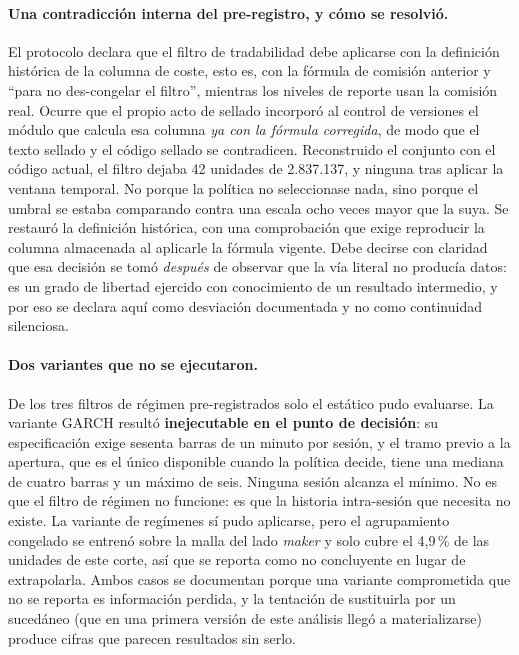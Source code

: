 \paragraph{Una contradicción interna del pre-registro, y cómo se resolvió.} El protocolo
declara que el filtro de tradabilidad debe aplicarse con la definición histórica de la
columna de coste, esto es, con la fórmula de comisión anterior y ``para no des-congelar el
filtro'', mientras los niveles de reporte usan la comisión real. Ocurre que el propio acto de sellado
incorporó al control de versiones el módulo que calcula esa columna \emph{ya con la
fórmula corregida}, de modo que el texto sellado y el código sellado se contradicen.
Reconstruido el conjunto con el código actual, el filtro dejaba 42 unidades de 2.837.137,
y ninguna tras aplicar la ventana temporal. No porque la política no seleccionase nada,
sino porque el umbral se estaba comparando contra una escala ocho veces mayor que la suya. Se
restauró la definición histórica, con una comprobación que exige reproducir la columna
almacenada al aplicarle la fórmula vigente. Debe decirse con claridad que esa decisión se
tomó \emph{después} de observar que la vía literal no producía datos: es un grado de
libertad ejercido con conocimiento de un resultado intermedio, y por eso se declara aquí
como desviación documentada y no como continuidad silenciosa.

\paragraph{Dos variantes que no se ejecutaron.} De los tres filtros de régimen pre-registrados solo
el estático pudo evaluarse. La variante GARCH resultó \textbf{inejecutable en el punto de
decisión}: su especificación exige sesenta barras de un minuto por sesión, y el tramo
previo a la apertura, que es el único disponible cuando la política decide, tiene una
mediana de cuatro barras y un máximo de seis. Ninguna sesión alcanza el mínimo. No es que
el filtro de régimen no funcione: es que la historia intra-sesión que necesita no existe. La
variante de regímenes sí pudo aplicarse, pero el agrupamiento congelado se entrenó sobre la
malla del lado \emph{maker} y solo cubre el 4,9\,\% de las unidades de este corte, así que
se reporta como no concluyente en lugar de extrapolarla. Ambos casos se documentan porque
una variante comprometida que no se reporta es información perdida, y la tentación de
sustituirla por un sucedáneo (que en una primera versión de este análisis llegó a
materializarse) produce cifras que parecen resultados sin serlo.

